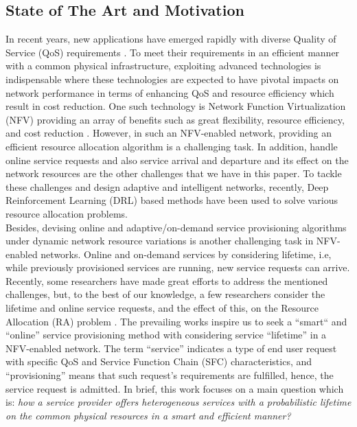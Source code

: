 \documentclass[20pt,twocolumn]{IEEEtran}
\begin{document}
	\subsection{State of The Art and Motivation
	 }
In recent years, new applications have emerged rapidly with diverse  Quality of Service	(QoS) requirements \cite{series2015imt}. To meet their requirements in an efficient manner with a common physical infrastructure, exploiting advanced technologies is indispensable where these technologies are expected to have pivotal impacts on network performance in terms of enhancing QoS and resource efficiency which result in cost reduction. One such technology is Network Function Virtualization (NFV)  providing an array of benefits such as great flexibility, resource efficiency, and cost reduction  \cite{cziva2017container}.
However, in such an NFV-enabled network, providing an efficient resource allocation algorithm is a challenging task. In addition, handle online service requests and also service arrival and  departure and  its effect on the network resources are the other challenges that we have in this paper.  To tackle these challenges and design adaptive and intelligent networks, recently, Deep Reinforcement Learning (DRL) based methods have been used to solve various resource allocation problems\cite{8403657, 8382166}.
 \\\indent Besides, devising online and adaptive/on-demand service provisioning algorithms  under dynamic network resource variations is  another challenging task in NFV-enabled  networks. Online and on-demand services by considering lifetime, i.e,    %
while previously provisioned  services are running, new  service requests can arrive. %
Recently, some researchers have made great efforts   to address the mentioned challenges, but, to the best of our knowledge, a few researchers consider the lifetime and online service requests, and the effect of this, on the Resource Allocation (RA) problem \cite{herrera2016resource, hamann2019path, 10.1145/3326285.3329056}.  The prevailing works  inspire us to
seek a ``smart`` and ``online'' service provisioning  method with considering service ``lifetime'' in a NFV-enabled network. The term ``service'' indicates a type of end user request with specific QoS and Service Function Chain (SFC) characteristics, and  ``provisioning'' means that such request's requirements are fulfilled, hence,  the service request is admitted. In brief, this work focuses on a main question which is: \textit{how a service provider offers heterogeneous services with a probabilistic lifetime on the common physical resources in a smart and efficient  manner?}
\end{document}
